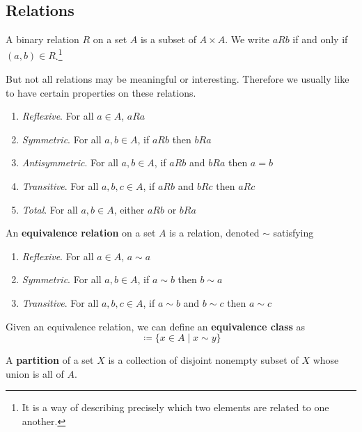 \subsection{Relations}

  \begin{definition}[Relation]
    A binary relation $R$ on a set $A$ is a subset of $A \times A$. We write $aRb$ if and only if $(a,b) \in R$.\footnote{It is a way of describing precisely which two elements are related to one another.} 
  \end{definition} 

  But not all relations may be meaningful or interesting. Therefore we usually like to have certain properties on these relations. 
  \begin{enumerate}
    \item \textit{Reflexive}. For all $a \in A$, $aRa$
    \item \textit{Symmetric}. For all $a,b \in A$, if $aRb$ then $bRa$
    \item \textit{Antisymmetric}. For all $a,b \in A$, if $aRb$ and $bRa$ then $a=b$
    \item \textit{Transitive}. For all $a,b,c \in A$, if $aRb$ and $bRc$ then $aRc$
    \item \textit{Total}. For all $a,b \in A$, either $aRb$ or $bRa$
  \end{enumerate}

  \begin{definition}
    An \textbf{equivalence relation} on a set $A$ is a relation, denoted $\sim$ satisfying 
    \begin{enumerate}
      \item \textit{Reflexive}. For all $a \in A$, $a \sim a$
      \item \textit{Symmetric}. For all $a,b \in A$, if $a \sim b$ then $b \sim a$
      \item \textit{Transitive}. For all $a,b,c \in A$, if $a \sim b$ and $b \sim c$ then $a \sim c$
    \end{enumerate}
    Given an equivalence relation, we can define an \textbf{equivalence class} as 
    \begin{equation}
      [y] \coloneqq \{ x \in A \mid x \sim y \}
    \end{equation}
  \end{definition}

  \begin{definition}[Partition]
    A \textbf{partition} of a set $X$ is a collection of disjoint nonempty subset of $X$ whose union is all of $A$. 
  \end{definition} 

